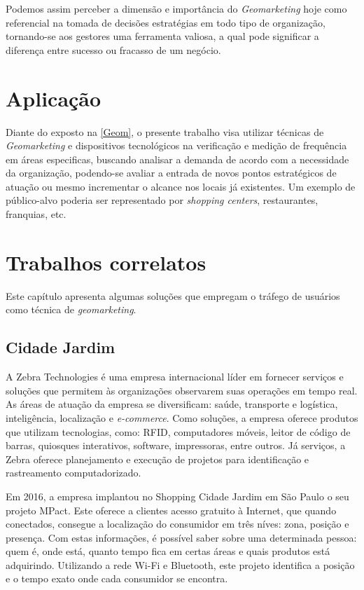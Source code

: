 Podemos assim perceber a dimensão e importância do \emph{Geomarketing} hoje como referencial na tomada de decisões estratégias em todo tipo de organização, tornando-se aos gestores uma ferramenta valiosa,  a qual pode significar a diferença entre sucesso ou fracasso de um negócio. 

\section{Aplicação}
Diante do exposto na \autoref{Geom}, o presente trabalho visa utilizar técnicas de \emph{Geomarketing} e dispositivos tecnológicos na verificação e medição de frequência em áreas especificas, buscando analisar a demanda de acordo com a necessidade da organização, podendo-se avaliar a entrada de novos pontos estratégicos de atuação ou mesmo incrementar o alcance nos locais já existentes. Um exemplo de público-alvo poderia ser representado por \emph{shopping centers}, restaurantes, franquias, etc.  

\section{Trabalhos correlatos}
Este capítulo apresenta algumas soluções que empregam o tráfego de usuários como técnica de \emph{geomarketing}.

\subsection{Cidade Jardim}
A Zebra Technologies é uma empresa internacional líder em fornecer serviços e soluções que permitem às organizações observarem suas operações em
tempo real. As áreas de atuação da empresa se diversificam: saúde,
transporte e logística, inteligência, localização e \emph{e-commerce}. Como soluções, a empresa oferece produtos
que utilizam tecnologias, como: RFID, computadores móveis, leitor de código de barras,
quiosques interativos, software, impressoras, entre outros. Já serviços, a Zebra oferece planejamento e execução de projetos para identificação
e rastreamento computadorizado.

Em 2016, a empresa implantou no Shopping Cidade Jardim em São Paulo o seu projeto MPact. Este oferece a clientes acesso gratuito à Internet,
que quando conectados, consegue a localização do consumidor em três níves: zona, posição e presença. Com estas informações, é possível saber
sobre uma determinada pessoa: quem é, onde está, quanto tempo fica em certas áreas e quais produtos está adquirindo. Utilizando a rede Wi-Fi e
Bluetooth, este projeto identifica a posição e o tempo exato onde cada consumidor se encontra.

